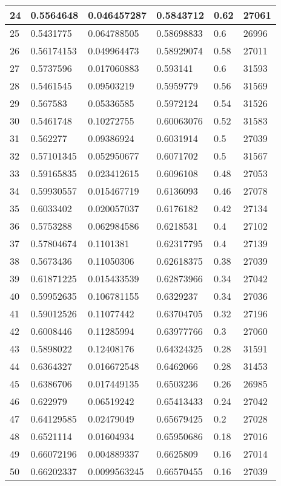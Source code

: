 \begin{longtable}{|l|l|l|l|l|l|}
24 & 0.5564648 & 0.046457287 & 0.5843712 & 0.62 & 27061 \\ \hline 
25 & 0.5431775 & 0.064788505 & 0.58698833 & 0.6 & 26996 \\ \hline 
26 & 0.56174153 & 0.049964473 & 0.58929074 & 0.58 & 27011 \\ \hline 
27 & 0.5737596 & 0.017060883 & 0.593141 & 0.6 & 31593 \\ \hline 
28 & 0.5461545 & 0.09503219 & 0.5959779 & 0.56 & 31569 \\ \hline 
29 & 0.567583 & 0.05336585 & 0.5972124 & 0.54 & 31526 \\ \hline 
30 & 0.5461748 & 0.10272755 & 0.60063076 & 0.52 & 31583 \\ \hline 
31 & 0.562277 & 0.09386924 & 0.6031914 & 0.5 & 27039 \\ \hline 
32 & 0.57101345 & 0.052950677 & 0.6071702 & 0.5 & 31567 \\ \hline 
33 & 0.59165835 & 0.023412615 & 0.6096108 & 0.48 & 27053 \\ \hline 
34 & 0.59930557 & 0.015467719 & 0.6136093 & 0.46 & 27078 \\ \hline 
35 & 0.6033402 & 0.020057037 & 0.6176182 & 0.42 & 27134 \\ \hline 
36 & 0.5753288 & 0.062984586 & 0.6218531 & 0.4 & 27102 \\ \hline 
37 & 0.57804674 & 0.1101381 & 0.62317795 & 0.4 & 27139 \\ \hline 
38 & 0.5673436 & 0.11050306 & 0.62618375 & 0.38 & 27039 \\ \hline 
39 & 0.61871225 & 0.015433539 & 0.62873966 & 0.34 & 27042 \\ \hline 
40 & 0.59952635 & 0.106781155 & 0.6329237 & 0.34 & 27036 \\ \hline 
41 & 0.59012526 & 0.11077442 & 0.63704705 & 0.32 & 27196 \\ \hline 
42 & 0.6008446 & 0.11285994 & 0.63977766 & 0.3 & 27060 \\ \hline 
43 & 0.5898022 & 0.12408176 & 0.64324325 & 0.28 & 31591 \\ \hline 
44 & 0.6364327 & 0.016672548 & 0.6462066 & 0.28 & 31453 \\ \hline 
45 & 0.6386706 & 0.017449135 & 0.6503236 & 0.26 & 26985 \\ \hline 
46 & 0.622979 & 0.06519242 & 0.65413433 & 0.24 & 27042 \\ \hline 
47 & 0.64129585 & 0.02479049 & 0.65679425 & 0.2 & 27028 \\ \hline 
48 & 0.6521114 & 0.01604934 & 0.65950686 & 0.18 & 27016 \\ \hline 
49 & 0.66072196 & 0.004889337 & 0.6625809 & 0.16 & 27014 \\ \hline 
50 & 0.66202337 & 0.0099563245 & 0.66570455 & 0.16 & 27039 \\ \hline 
\end{longtable}